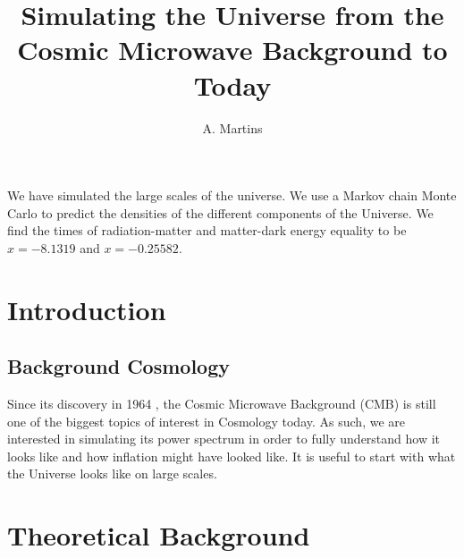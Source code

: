 \documentclass{aa}
\begin{document}
 


   \title{Simulating the Universe from the Cosmic Microwave Background to Today}

   \subtitle{}

   \author{A. Martins
          }


   \date{}

 
  \abstract
   {}
   {We have simulated the large scales of the universe.}
   {We use a Markov chain Monte Carlo to predict the densities of the different components of the Universe.}
   {We find the times of radiation-matter and matter-dark energy equality to be $x=−8.1319$ and $x=−0.25582$.}
   {}


   \maketitle
%

\section{Introduction}

\subsection{Background Cosmology}
Since its discovery in 1964 \citep{1965ApJ...142..419P, 1965ApJ...142..414D}, the Cosmic Microwave Background (CMB) is still one of the biggest topics of interest in Cosmology today.
As such, we are interested in simulating its power spectrum in order to fully understand how it looks like and how inflation might have looked like. It is useful to start with what the Universe looks like on large scales.

\section{Theoretical Background}
\end{document}
